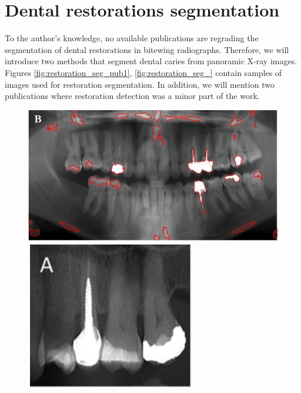 \section{Dental restorations segmentation}
\label{sec:related_works:dental_restorations}
To the author's knowledge, no available publications are regrading the segmentation of dental restorations in bitewing radiographs. Therefore, we will introduce two methods that segment dental caries from panoramic X-ray images. Figures \ref{fig:restoration_seg_pub1}, \ref{fig:restoration_seg_} contain samples of images used for restoration segmentation.
In addition, we will mention two publications where restoration detection was a minor part of the work.
\begin{figure}
    \begin{floatrow}[2]
        {\includegraphics[width=\linewidth]{images/segmentation_opg.png}}\;
        {\includegraphics[width=\linewidth]{images/segmentation_crop.png}}
    \end{floatrow}
\end{figure}
